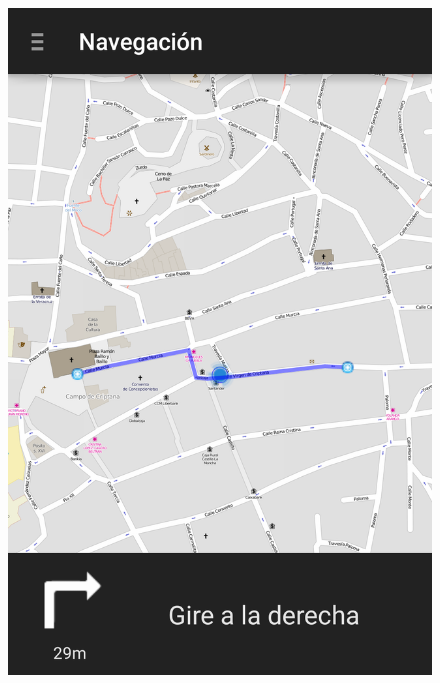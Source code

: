 \begin{slide}
  \begin{center}
    \begin{minipage}[b]{0.3\linewidth}
      \begin{center}
        \begin{figure}
          \includegraphics[height=0.65\textheight]{img/naviganto-rutaderecha.png}
        \end{figure}
      \end{center}
    \end{minipage}
    \begin{minipage}[b]{0.3\linewidth}
      \begin{center}
        \begin{figure}

\end{figure}
\end{center}
\end{minipage}
\end{center}
\end{slide}
